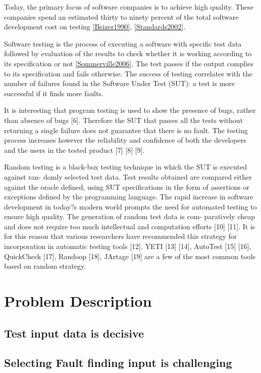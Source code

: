 

Today, the primary focus of software companies is to achieve high quality. These companies spend an estimated thirty to ninety percent of the total software development cost on testing \ref{Beizer1990}, \ref{Standards2002}. 

Software testing is the process of executing a software with specific test data followed by evaluation of the results to check whether it is working according to its specification or not \ref{Sommerville2006}.
The test passes if the output complies to its specification and fails otherwise. The success of testing correlates with the number of failures found in the Software Under Test (SUT): a test is more successful if it finds more faults.

It is interesting that program testing is used to show the presence of bugs, rather than absence of bugs [6]. Therefore the SUT that passes all the tests without returning a single failure does not guarantee that there is no fault. The testing process increases however the reliability and confidence of both the developers and the users in the tested product [7] [8] [9].

Random testing is a black-box testing technique in which the SUT is executed against ran- domly selected test data. Test results obtained are compared either against the oracle defined, using SUT specifications in the form of assertions or exceptions defined by the programming language. The rapid increase in software development in today?s modern world prompts the need for automated testing to ensure high quality. The generation of random test data is com- paratively cheap and does not require too much intellectual and computation efforts [10] [11]. It is for this reason that various researchers have recommended this strategy for incorporation in automatic testing tools [12]. YETI [13] [14], AutoTest [15] [16], QuickCheck [17], Randoop [18], JArtage [19] are a few of the most common tools based on random strategy.

\section{Problem Description}
\subsection{Test input data is decisive}
\subsection{Selecting Fault finding input is challenging}

